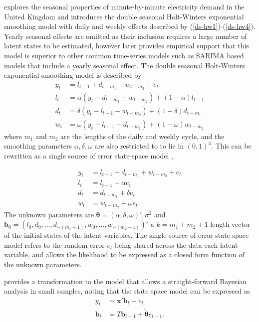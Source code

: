 \documentclass[12pt,a4paper]{article}%
\numberwithin{equation}{section}
\begin{document}
\citet{Taylor2003} explores the seasonal properties of minute-by-minute electricity demand in the United Kingdom and introduces the double seasonal Holt-Winters exponential smoothing model with daily and weekly effects described by (\ref{ds-hw1})-(\ref{ds-hw4}). Yearly seasonal effects are omitted as their inclusion requires a large number of latent states to be estimated, however \citet{Taylor2008} later provides empirical support that this model is superior to other common time-series models such as SARIMA based models that include a yearly seasonal effect. The double seasonal Holt-Winters exponential smoothing model is described by
\begin{align}
y_t &= l_{t-1} + d_{t-m_1} + w_{t-m_2} + e_t \label{ds-hw1} \\
l_t &= \alpha (y_t - d_{t-m_1} - w_{t-m_2}) + (1 - \alpha)l_{t-1} \label{ds-hw2}\\
d_t &= \delta (y_t - l_{t-1} - w_{t-m_2}) + (1 - \delta)d_{t-m_1} \label{ds-hw3} \\
w_t &= \omega (y_t - l_{t-1} - d_{t-m_1}) + (1 - \omega)w_{t-m_2} \label{ds-hw4}
\end{align}
where $m_1$ and $m_2$ are the lengths of the daily and weekly cycle, and the smoothing parameters $\alpha, \delta, \omega$ are also restricted to to lie in $(0, 1)^3$. This can be rewritten as a single source of error state-space model \citep{Snyder1985},

\begin{align}
y_t &= l_{t-1} + d_{t-m_1} + w_{t-m_2} + e_t \label{ds-hw-ssoe1} \\
l_t &= l_{t-1} + \alpha e_t \label{ds-hw-ssoe2} \\
d_t &= d_{t-m_1} + \delta e_t \label{ds-hw-ssoe3} \\
w_t &= w_{t-m_2} + \omega e_t \label{ds-hw-ssoe4}. 
\end{align}
The unknown parameters are $\boldsymbol{\theta} = (\alpha, \delta, \omega)', \sigma^2$ and $\textbf{b}_0 = (l_0, d_0, \dots, d_{-(m_1 - 1)}, w_0, \dots, w_{-(m_2 - 1)})'$ a $k = m_1 + m_2 + 1$ length vector of the initial states of the latent variables. The single source of error state-space model refers to the random error $e_t$ being shared across the data each latent variable, and allows the likelihood to be expressed as a closed form function of the unknown parameters.

\citet{Forbes2000} provides a transformation to the model that allows a straight-forward Bayesian analysis in small samples, noting that the state space model can be expressed as
\begin{align}
y_t &= \textbf{x}' \textbf{b}_t + e_t \label{ss_me} \\
\textbf{b}_t &= T \textbf{b}_{t-1} + \tilde{\boldsymbol{\theta}} e_{t-1} \label{ss_te}.
\end{align}
\end{document}
